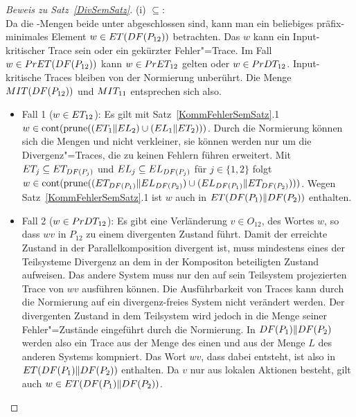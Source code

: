 \begin{proof}[Beweis zu Satz~\ref{DivSemSatz}]
  (i) \glqq $\subseteq$\grqq{}:\\
  Da die \ET{}-Mengen beide unter \cont{} abgeschlossen sind, kann man ein
  beliebiges präfix-minimales Element $w\in ET (DF (P_{12}))$ betrachten.
  Das $w$ kann ein Input-kritischer Trace sein oder ein gekürzter
  Fehler"=Trace. Im Fall $w\in PrET (DF (P_{12}))$ kann $w\in PrET _{12}$
  gelten oder $w\in PrDT _{12}$. Input-kritische Traces bleiben von der
  Normierung unberührt. Die Menge $MIT (DF (P_{12}))$ und $MIT _{11}$
  entsprechen sich also.
  \begin{itemize}
    \item Fall 1 ($w\in ET _{12}$): Es gilt mit Satz~\ref{KommFehlerSemSatz}.1
      $w\in \mathrm{cont} (\mathrm{prune} ((ET _1\|EL _2)\cup (EL _1\|ET _2)))$. Durch die
      Normierung können sich die Mengen \ET{} und \EL{} nicht verkleiner, sie
      können werden nur um die Divergenz"=Traces, die zu keinen Fehlern führen
      erweitert. Mit $ET _j \subseteq ET _{DF (P_j)}$ und $EL _j \subseteq
      EL _{DF (P_j)}$ für $j\in \{1,2\}$ folgt $w\in \mathrm{cont} (\mathrm{prune} ((ET
      _{DF (P_1)}\|EL _{DF (P_2)})\cup (EL _{DF (P_1)}\|ET _{DF
      (P_2)})))$. Wegen Satz~\ref{KommFehlerSemSatz}.1 ist $w$ auch in $ET
      (DF (P_1)\|DF (P_2))$ enthalten.
    \item Fall 2 ($w\in PrDT _{12}$): Es gibt eine Verländerung $v\in O_{12}$,
      des Wortes $w$, so dass $wv$ in $P_{12}$ zu einem divergenten Zustand
      führt. Damit der erreichte Zustand in der Parallelkomposition divergent
      ist, muss mindestens eines der Teilsysteme Divergenz an dem in der
      Kompositon beteiligten Zustand aufweisen. Das andere System muss nur den
      auf sein Teilsystem projezierten Trace von $wv$ ausführen können. Die
      Ausführbarkeit von Traces kann durch die Normierung auf ein
      divergenz-freies System nicht verändert werden. Der divergenten Zustand
      in dem Teilsystem wird jedoch in die Menge seiner Fehler"=Zustände
      eingeführt durch die Normierung. In $DF (P_1)\|DF (P_2)$ werden also
      ein Trace aus der Menge \ET{} des einen und aus der Menge $L$ des anderen
      Systems kompniert. Das Wort $wv$, dass dabei entsteht, ist also in $ET
      (DF (P_1)\|DF (P_2))$ enthalten. Da $v$ nur aus lokalen Aktionen
      besteht, gilt auch $w\in ET (DF (P_1)\|DF (P_2))$.
  \end{itemize}


\end{proof}
